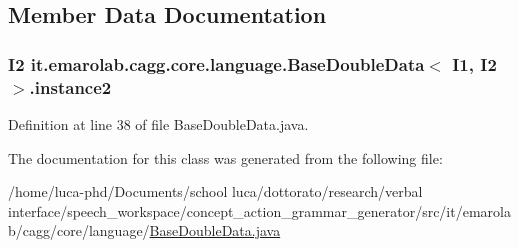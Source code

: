 \subsection{Member Data Documentation}
\hypertarget{classit_1_1emarolab_1_1cagg_1_1core_1_1language_1_1BaseDoubleData_3_01I1_00_01I2_01_4_abc041cee0a1cc9732753a909ff33bcf8}{
\subsubsection[{instance2}]{\setlength{\rightskip}{0pt plus 5cm}I2 it.\-emarolab.\-cagg.\-core.\-language.\-Base\-Double\-Data$<$ I1, I2 $>$.instance2\hspace{0.3cm}{\ttfamily [private]}}}\label{classit_1_1emarolab_1_1cagg_1_1core_1_1language_1_1BaseDoubleData_3_01I1_00_01I2_01_4_abc041cee0a1cc9732753a909ff33bcf8}


Definition at line 38 of file Base\-Double\-Data.\-java.



The documentation for this class was generated from the following file\-:\begin{DoxyCompactItemize}
\item 
/home/luca-\/phd/\-Documents/school luca/dottorato/research/verbal interface/speech\-\_\-workspace/concept\-\_\-action\-\_\-grammar\-\_\-generator/src/it/emarolab/cagg/core/language/\hyperlink{BaseDoubleData_8java}{Base\-Double\-Data.\-java}\end{DoxyCompactItemize}
